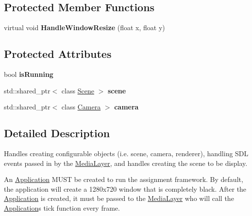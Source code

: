 \subsection*{Protected Member Functions}
\begin{DoxyCompactItemize}
\item 
\hypertarget{class_application_abdba284a0f075ee1d4a2108c3a5236a2}{}virtual void {\bfseries Handle\+Window\+Resize} (float x, float y)\label{class_application_abdba284a0f075ee1d4a2108c3a5236a2}

\end{DoxyCompactItemize}
\subsection*{Protected Attributes}
\begin{DoxyCompactItemize}
\item 
\hypertarget{class_application_ae1c1ff7a7663d9baa9b65a7ba8e1dcf8}{}bool {\bfseries is\+Running}\label{class_application_ae1c1ff7a7663d9baa9b65a7ba8e1dcf8}

\item 
\hypertarget{class_application_a88c6615107a5094bb93fa5f153f79554}{}std\+::shared\+\_\+ptr$<$ class \hyperlink{class_scene}{Scene} $>$ {\bfseries scene}\label{class_application_a88c6615107a5094bb93fa5f153f79554}

\item 
\hypertarget{class_application_a0e8589fcb13c520ba472473abe5a518d}{}std\+::shared\+\_\+ptr$<$ class \hyperlink{class_camera}{Camera} $>$ {\bfseries camera}\label{class_application_a0e8589fcb13c520ba472473abe5a518d}

\end{DoxyCompactItemize}


\subsection{Detailed Description}
Handles creating configurable objects (i.\+e. scene, camera, renderer), handling S\+D\+L events passed in by the \hyperlink{class_media_layer}{Media\+Layer}, and handles creating the scene to be display. 

An \textquotesingle{}\hyperlink{class_application}{Application}\textquotesingle{} M\+U\+S\+T be created to run the assignment framework. By default, the application will create a 1280x720 window that is completely black. After the \textquotesingle{}\hyperlink{class_application}{Application}\textquotesingle{} is created, it must be passed to the \textquotesingle{}\hyperlink{class_media_layer}{Media\+Layer}\textquotesingle{} who will call the \textquotesingle{}\hyperlink{class_application}{Application}\textquotesingle{}s tick function every frame. 

